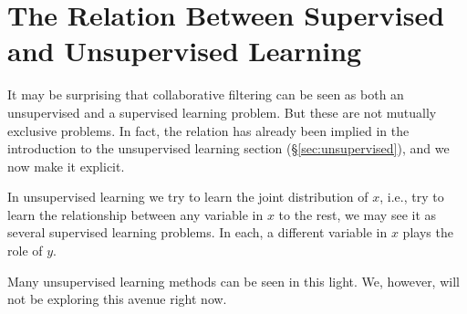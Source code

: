 \section{The Relation Between Supervised and Unsupervised Learning}
It may be surprising that collaborative filtering can be seen as both an unsupervised and a supervised learning problem.
But these are not mutually exclusive problems. 
In fact, the relation has already been implied in the introduction to the unsupervised learning section (\S\ref{sec:unsupervised}), and we now make it explicit.

In unsupervised learning we try to learn the joint distribution of $x$, i.e., try to learn the relationship between any variable in $x$ to the rest, we may see it as several supervised learning problems. In each, a different variable in $x$ plays the role of $y$. 

Many unsupervised learning methods can be seen in this light. We, however, will not be exploring this avenue right now.